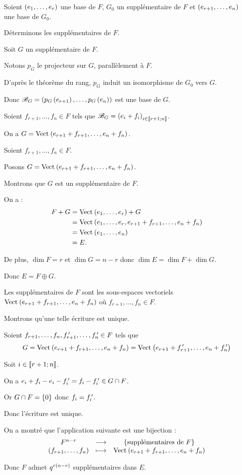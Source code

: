 \begin{corr}[3]
Soient \(\left(e_1,\dots,e_r\right)\) une base de \(F\), \(G_0\) un supplémentaire de \(F\) et \(\left(e_{r+1},\dots,e_n\right)\) une base de \(G_0\).

Déterminons les supplémentaires de \(F\).

\analyse

Soit \(G\) un supplémentaire de \(F\).

Notons \(p_G\) le projecteur sur \(G\), parallèlement à \(F\).

D'après le théorème du rang, \(p_G\) induit un isomorphisme de \(G_0\) vers \(G\).

Donc \(\mathscr{B}_G=\left(p_G\left(e_{r+1}\right),\dots,p_G\left(e_n\right)\right)\) est une base de \(G\).

Soient \(f_{r+1},\dots,f_n\in F\) tels que \(\mathscr{B}_G=\left(e_i+f_i\right)_{i\in\left\llbracket r+1;n\right\rrbracket}\).

On a \(G=\Vect{e_{r+1}+f_{r+1},\dots,e_n+f_n}\).

\synthese

Soient \(f_{r+1},\dots,f_n\in F\).

Posons \(G=\Vect{e_{r+1}+f_{r+1},\dots,e_n+f_n}\).

Montrons que \(G\) est un supplémentaire de \(F\).

On a : \[\begin{aligned}
F+G&=\Vect{e_1,\dots,e_r}+G \\
&=\Vect{e_1,\dots,e_r,e_{r+1}+f_{r+1},\dots,e_n+f_n} \\
&=\Vect{e_1,\dots,e_n} \\
&=E.
\end{aligned}\]

De plus, \(\dim F=r\) et \(\dim G=n-r\) donc \(\dim E=\dim F+\dim G\).

Donc \(E=F\oplus G\).

\conclusion Les supplémentaires de \(F\) sont les sous-espaces vectoriels \(\Vect{e_{r+1}+f_{r+1},\dots,e_n+f_n}\) où \(f_{r+1},\dots,f_n\in F\).

Montrons qu'une telle écriture est unique.

Soient \(f_{r+1},\dots,f_n,f_{r+1}^{\,\prime},\dots,f_n^{\,\prime}\in F\) tels que \[G=\Vect{e_{r+1}+f_{r+1},\dots,e_n+f_n}=\Vect{e_{r+1}+f_{r+1}\prim,\dots,e_n+f_n\prim}\]

Soit \(i\in\left\llbracket r+1;n\right\rrbracket\).

On a \(e_i+f_i-e_i-f_i^{\,\prime}=f_i-f_i^{\,\prime}\in G\cap F\).

Or \(G\cap F=\left\lbrace0\right\rbrace\) donc \(f_i=f_i^{\,\prime}\).

Donc l'écriture est unique.

On a montré que l'application suivante est une bijection : \[\fonctionlambda{F^{n-r}}{\accol{\text{supplémentaires de }F}}{\paren{f_{r+1},\dots,f_n}}{\Vect{e_{r+1}+f_{r+1},\dots,e_n+f_n}}\]

Donc \(F\) admet \(q^{r\left(n-r\right)}\) supplémentaires dans \(E\).
\end{corr}

